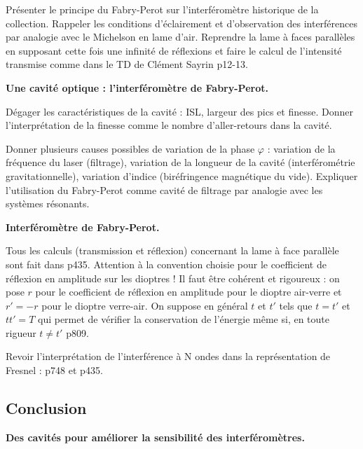 Présenter le principe du Fabry-Perot sur l'interféromètre historique de la collection.
Rappeler les conditions d'éclairement et d'observation des interférences par analogie avec le Michelson en lame d'air.
Reprendre la lame à faces parallèles en supposant cette fois une infinité de réflexions et faire le calcul de l'intensité transmise comme dans le TD de Clément Sayrin p12-13.

\begin{slide}
\textbf{Une cavité optique : l'interféromètre de Fabry-Perot.}
\end{slide}
Dégager les caractéristiques de la cavité : ISL, largeur des pics et finesse.
Donner l'interprétation de la finesse comme le nombre d'aller-retours dans la cavité.

Donner plusieurs causes possibles de variation de la phase $\varphi$ : variation de la fréquence du laser (filtrage), variation de la longueur de la cavité (interférométrie gravitationnelle), variation d'indice (biréfringence magnétique du vide).
Expliquer l'utilisation du Fabry-Perot comme cavité de filtrage par analogie avec les systèmes résonants.

\begin{experience}
\textbf{Interféromètre de Fabry-Perot.}
\end{experience}

\begin{remarque}
Tous les calculs (transmission et réflexion) concernant la lame à face parallèle sont fait dans \cite{Hecht2002} p435.
Attention à la convention choisie pour le coefficient de réflexion en amplitude sur les dioptres !
Il faut être cohérent et rigoureux : on pose $r$ pour le coefficient de réflexion en amplitude pour le dioptre air-verre et $r'=-r$ pour le dioptre verre-air.
On suppose en général $t$ et $t'$ tels que $t=t'$ et $tt'=T$ qui permet de vérifier la conservation de l'énergie même si, en toute rigueur $t\ne t'$ \cite{Olivier2000} p809.

\noindent
Revoir l'interprétation de l'interférence à N ondes dans la représentation de Fresnel : \cite{Sanz2016} p748 et \cite{Hecht2002} p435.  
\end{remarque}

\subsection*{Conclusion}

\begin{slide}
\textbf{Des cavités pour améliorer la sensibilité des interféromètres.}
\end{slide}

